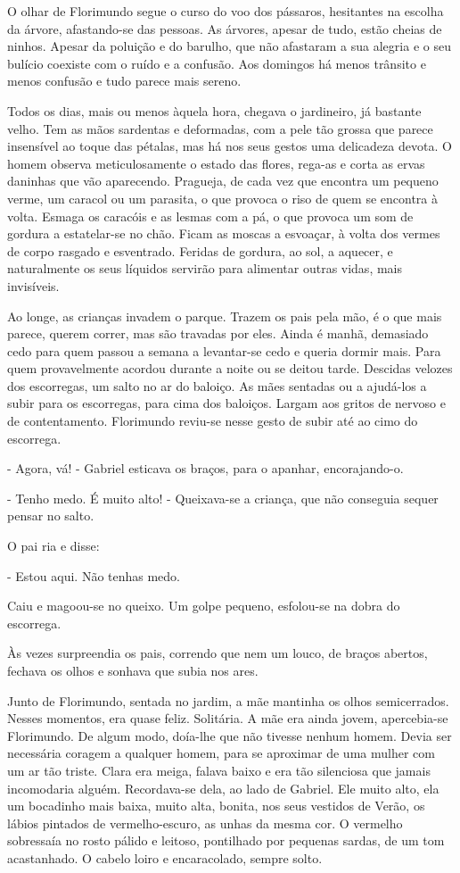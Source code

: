 O olhar de Florimundo segue o curso do voo dos pássaros, hesitantes na
escolha da árvore, afastando-se das pessoas. As árvores, apesar de tudo,
estão cheias de ninhos. Apesar da poluição e do barulho, que não
afastaram a sua alegria e o seu bulício coexiste com o ruído e a
confusão. Aos domingos há menos trânsito e menos confusão e tudo parece
mais sereno.

Todos os dias, mais ou menos àquela hora, chegava o jardineiro, já
bastante velho. Tem as mãos sardentas e deformadas, com a pele tão
grossa que parece insensível ao toque das pétalas, mas há nos seus
gestos uma delicadeza devota. O homem observa meticulosamente o estado
das flores, rega-as e corta as ervas daninhas que vão aparecendo.
Pragueja, de cada vez que encontra um pequeno verme, um caracol ou um
parasita, o que provoca o riso de quem se encontra à volta. Esmaga os
caracóis e as lesmas com a pá, o que provoca um som de gordura a
estatelar-se no chão. Ficam as moscas a esvoaçar, à volta dos vermes de
corpo rasgado e esventrado. Feridas de gordura, ao sol, a aquecer, e
naturalmente os seus líquidos servirão para alimentar outras vidas, mais
invisíveis.

Ao longe, as crianças invadem o parque. Trazem os pais pela mão, é o que
mais parece, querem correr, mas são travadas por eles. Ainda é manhã,
demasiado cedo para quem passou a semana a levantar-se cedo e queria
dormir mais. Para quem provavelmente acordou durante a noite ou se
deitou tarde. Descidas velozes dos escorregas, um salto no ar do
baloiço. As mães sentadas ou a ajudá-los a subir para os escorregas,
para cima dos baloiços. Largam aos gritos de nervoso e de contentamento.
Florimundo reviu-se nesse gesto de subir até ao cimo do escorrega.

- Agora, vá! - Gabriel esticava os braços, para o apanhar,
encorajando-o.

- Tenho medo. É muito alto! - Queixava-se a criança, que não conseguia
sequer pensar no salto.

O pai ria e disse:

- Estou aqui. Não tenhas medo.

Caiu e magoou-se no queixo. Um golpe pequeno, esfolou-se na dobra do
escorrega.

Às vezes surpreendia os pais, correndo que nem um louco, de braços
abertos, fechava os olhos e sonhava que subia nos ares.

Junto de Florimundo, sentada no jardim, a mãe mantinha os olhos
semicerrados. Nesses momentos, era quase feliz. Solitária. A mãe era
ainda jovem, apercebia-se Florimundo. De algum modo, doía-lhe que não
tivesse nenhum homem. Devia ser necessária coragem a qualquer homem,
para se aproximar de uma mulher com um ar tão triste. Clara era meiga,
falava baixo e era tão silenciosa que jamais incomodaria alguém.
Recordava-se dela, ao lado de Gabriel. Ele muito alto, ela um bocadinho
mais baixa, muito alta, bonita, nos seus vestidos de Verão, os lábios
pintados de vermelho-escuro, as unhas da mesma cor. O vermelho
sobressaía no rosto pálido e leitoso, pontilhado por pequenas sardas, de
um tom acastanhado. O cabelo loiro e encaracolado, sempre solto.

